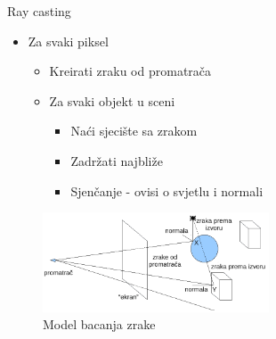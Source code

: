 \documentclass[9pt]{beamer}
\begin{document}
%

\begin{frame}{Ray casting}
\begin{itemize}
	\item Za svaki piksel
	\begin{itemize}
		\item Kreirati zraku od promatrača
		\item Za svaki objekt u sceni
		\begin{itemize}
			\item Naći sjecište sa zrakom
			\item Zadržati najbliže
			\item Sjenčanje - ovisi o svjetlu i normali
		\end{itemize}
	\end{itemize}
\end{itemize}
\begin{figure}
	 \includegraphics[width=0.6\textwidth]{./slike/model_bacanja_zrake.png}
	 \caption{Model bacanja zrake}
\end{figure}
\end{frame}	
\end{document}
